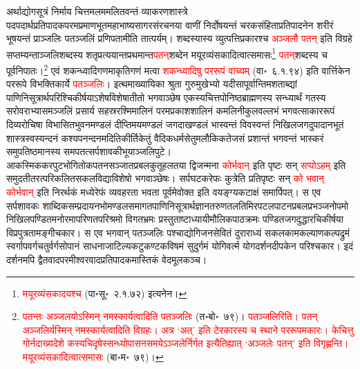 \begin{sloppypar}\justifying\noindent अर्थाद्योगसूत्रं 
निर्माय चित्तमलममलितवन्तं व्याकरण\-शास्त्रे पद\-पदार्थ\-प्रतिपादक\-परम\-प्रमाणभूत\-महाभाष्य\-सागर\-संरचनया वाणीं निर्दोषयन्तं चरकसंहिता\-प्रतिपादनेन शरीरं भूषयन्तं प्राञ्जलिः पतञ्जलिं प्रणिपतामीति तात्पर्यम्। \label{text:patanjali} शब्दस्यास्य व्युत्पत्ति\-प्रकारश्च \textcolor{red}{अञ्जलौ पतन्} इति विग्रहे सप्तम्यन्ताञ्जलिशब्दस्य शतृ\-प्रत्ययान्त\-प्रथमान्त\-\textcolor{red}{पतन्‌}\-शब्देन मयूर\-व्यंसकादित्वात्समासः\footnote{\textcolor{red}{मयूर\-व्यंसकादयश्च} (पा॰सू॰~२.१.७२) इत्यनेन।} \textcolor{red}{पतन्‌}\-शब्दस्य च पूर्वनिपातः।\footnote{\textcolor{red}{पतन्तः अञ्जलयोऽस्मिन् नमस्कार्यत्वादिति पतञ्जलिः} (त॰बो॰~७९)। \textcolor{red}{पतञ्जलिरिति। पतन् अञ्जलिर्यस्मिन् नमस्कार्यत्वादिति विग्रहः। अत्र ‘अत्’ इति टेरकारस्य च स्थाने पररूपमकारः। केचित्तु गोर्नदाख्य\-देशे कस्यचिदृषेस्सन्ध्योपासन\-समयेऽञ्जलेर्निर्गत इत्यैतिह्यात् ‘अञ्जलेः पतन्’ इति विगृह्णन्ति। मयूर\-व्यंसकादित्वात्समासः} (बा॰म॰~७९)।} एवं शकन्ध्वादि\-गणमाकृति\-गणं मत्वा \textcolor{red}{शकन्ध्वादिषु पररूपं वाच्यम्} (वा॰~६.१.९४) इति वार्त्तिकेन पररूपे विभक्तिकार्ये \textcolor{red}{पतञ्जलिः}। इत्थमाख्यायिका श्रुता गुरुमुखेभ्यो यदीसा\-पूर्वान्तिम\-शताब्द्यां पाणिनि\-सूत्रार्थ\-परिश्चिकीर्षयाऽशेष\-विशेषातीतो भगवाञ्छेष एकस्यचित्तपो\-निष्ठ\-ब्राह्मणस्य सन्ध्यार्थं गतस्य सरोवराभ्यासमञ्जलिं प्रसार्य सहस्र\-रश्मि\-मालिनं परम\-प्रकाश\-शालिनं कमलिनी\-कुल\-वल्लभं भगवत्साकाररूपं दिव्य\-रोचिषा विभासित\-भुवन\-मण्डलं दीप्तिमय\-मण्डलं जगदाखण्डलं भास्वन्तं विवस्वन्तं निखिल\-जगदुपादान\-भूतं शास्त्र\-स्व\-स्यन्दनं कश्यप\-नन्दनमदिति\-कीर्ति\-केतुं वैदिक\-धर्म\-सेतुमलौकिक\-तेजसं प्रशान्तं भगवन्तं भास्करं समुप\-तिष्ठमानस्य समपतत्सर्पशावकी\-भूयाञ्जलि\-पुटे। आकस्मिक\-करपुट\-भोगि\-तोक\-पतन\-सञ्जात\-प्रबल\-कुतूहलतया द्विजन्मना \textcolor{red}{कोर्भवान्} इति पृष्टः सन् \textcolor{red}{सप्पोऽहम्} इति समुदतीतरत्परिकलित\-सकल\-विद्याविशेषो भगवाञ्छेषः। सर्पघटकरेफः कुत्रेति प्रतिपृष्टः सन् \textcolor{red}{को भवान् कोर्भवान्} इति निरर्थकं मध्येरेफं
व्यवहरता भवता पूर्वमेवोक्त इति वयङ्ग्य\-कटाक्षं समार्पिपत्। स एव सर्प\-शावकः शाब्दिक\-सम्प्रदाय\-नभोमण्डल\-समागत\-पाणिनि\-सूत्रार्थ\-ज्ञान\-तरुण\-तल\-तिमिर\-पटल\-पाटन\-प्रबल\-प्रभञ्जनोपमो निखिल\-पण्डित\-मनोरमा\-परिणत\-परिश्रमो विगत\-भ्रमः प्रस्तुताष्टाध्यायी\-मौलिक\-पाठक्रमः पण्डित\-जगदुद्धार\-चिकीर्षया विप्रपुत्रतामङ्गीचकार। स एव भगवान् पतञ्जलिः पश्चाद्योगिजन\-सेवितं दुराराध्यं सकल\-काम\-कल्याण\-कल्पद्रुमं स्वर्गापवर्ग\-चतुर्वर्ग\-सोपानं साधना\-जाटिल्य\-कटु\-कण्टक\-विषमं सुदुर्गमं योगि\-वर्त्म योग\-दर्शन\-दीपकेन परिश्चकार। इदं दर्शनमपि द्वैतवादपरमीश्वरवाद\-प्रतिपादकमास्तिकं वेदमूलकञ्च।\end{sloppypar}
